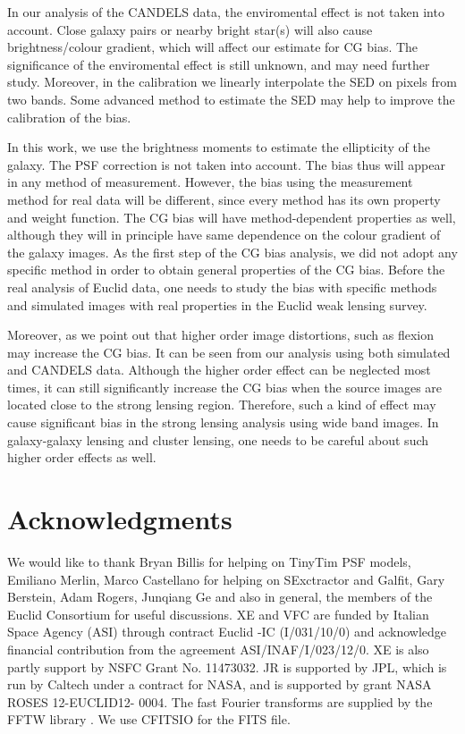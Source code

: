 \documentclass[useAMS,usenatbib]{mn2e}
\begin{document}
In our analysis of the CANDELS data, the enviromental effect is not
taken into account. Close galaxy pairs or nearby bright star(s) will
also cause brightness/colour gradient, which will affect our estimate
for CG bias. The significance of the enviromental effect is still
unknown, and may need further study. Moreover, in the calibration we
linearly interpolate the SED on pixels from two bands. Some advanced
method to estimate the SED \citep[e.g.][]{2016A&A...589A...2J} may
help to improve the calibration of the bias.

In this work, we use the brightness moments to estimate the
ellipticity of the galaxy. The PSF correction is not taken into
account. The bias thus will appear in any method of measurement.
However, the bias using the measurement method for real data
will be different, since every method has its own property and weight
function. The CG bias will have method-dependent properties as well,
although they will in principle have same dependence on the colour
gradient of the galaxy images. As the first step of the CG bias
analysis, we did not adopt any specific method in order to obtain
general properties of the CG bias. Before the real analysis of Euclid
data, one needs to study the bias with specific methods and simulated
images with real properties in the Euclid weak lensing survey.


%
Moreover, as we point out that higher order image distortions, such as
flexion may increase the CG bias. It can be seen from our analysis
using both simulated and CANDELS data. Although the higher order
effect can be neglected most times, it can still significantly
increase the CG bias when the source images are located close to the
strong lensing region. Therefore, such a kind of effect may cause
significant bias in the strong lensing analysis using wide band
images. In galaxy-galaxy lensing and cluster lensing, one needs to
be careful about such higher order effects as well.


\section*{Acknowledgments}
        
We would like to thank Bryan Billis for helping on TinyTim PSF models, Emiliano Merlin, Marco Castellano for helping on SExctractor and Galfit, Gary Berstein, Adam Rogers, Junqiang Ge and also in general, the members of the Euclid Consortium for useful discussions.
XE and VFC are funded by Italian Space Agency (ASI) through contract Euclid -IC (I/031/10/0) and acknowledge financial contribution from the agreement ASI/INAF/I/023/12/0. XE is also partly support by NSFC Grant No. 11473032. JR is supported by JPL, which is run by Caltech under a contract for NASA, and is supported by grant NASA ROSES 12-EUCLID12- 0004. The fast Fourier transforms are supplied by the FFTW library \citep{fftw05}. We use CFITSIO \citep{1999ASPC..172..487P} for the FITS file. 
         
\end{document}
